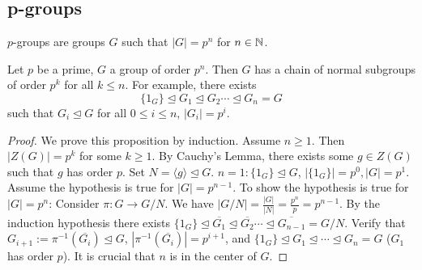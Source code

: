 \subsection{p-groups}
$p$-groups are groups $G$ such that $|G|=p^{n}$ for $n\in \mathbb{N}$.
\begin{prop}
    Let $p$ be a prime, $G$ a group of order $p^{n}$. Then $G$ has a chain of normal subgroups of order $p^{k}$ for all $k \leq n$. For example, there exists \[
    \{1_G\} \trianglelefteq G_1 \trianglelefteq G_2 \cdots \trianglelefteq G_n=G
    \] such that $G_i \trianglelefteq G$ for all $0\leq i \leq n$, $|G_i|=p^{i}$.
\end{prop}
\begin{proof}
    We prove this proposition by induction. Assume $n\geq 1$. Then $|Z(G)|=p^k$ for some $k\geq 1$. By Cauchy's Lemma, there exists some $g\in Z(G)$ such that $g$ has order $p$. Set $N=\langle g \rangle \trianglelefteq G$. $n=1: \{1_G\} \trianglelefteq G$, $|\{1_G\}| =p^{0}, |G|=p^{1}$. Assume the hypothesis is true for $|G|=p^{n-1}$. To show the hypothesis is true for $|G|=p^{n}$: Consider $\pi \colon G \to G /N$. We have $|G /N|=\frac{|G|}{|N|}=\frac{p^{n}}{p}=p^{n-1}$. By the induction hypothesis there exists $\{1_G\} \trianglelefteq \overline{G_1}\trianglelefteq \overline{G_2}\cdots \trianglelefteq \overline{G_{n-1}}=G /N$. Verify that $G_{i+1}:=\pi^{-1}(\overline{G_i})\trianglelefteq G$, $\left| \pi^{-1}(\overline{G_i})\right|=p^{i+1}$, and $\{1_G\} \trianglelefteq G_1 \trianglelefteq \cdots \trianglelefteq G_n=G$ ($G_1$ has order $p$). It is crucial that $n$ is in the center of $G$.
\end{proof}

